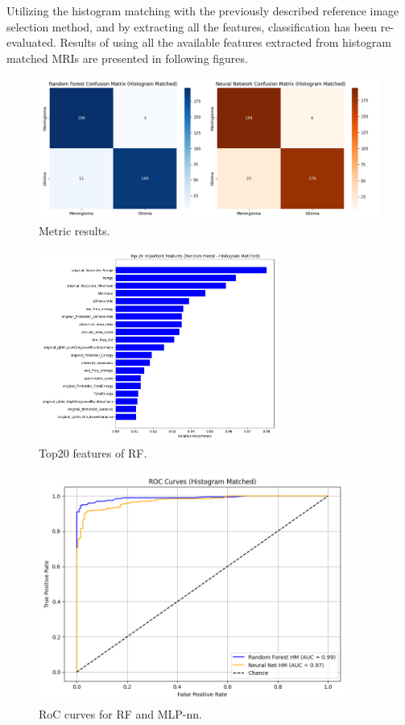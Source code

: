 \documentclass[11pt,a4paper]{article}
\begin{document}
		Utilizing the histogram matching with the previously described reference image selection method,
		and by extracting all the features, classification has been re-evaluated.
		Results of using all the available features extracted from histogram matched MRIs 
		are presented in following figures.
		\begin{figure}[H]
			\centering
			\includegraphics[width=1.1\textwidth]{images/metrics_hm.png}
			\caption{Metric results.}
			\label{fig1:}
		\end{figure}		

		\begin{figure}[H]
			\centering
			\includegraphics[width=0.7\textwidth]{images/top20_rf_hm.png}
			\caption{Top20 features of RF.}
			\label{fig1:}
		\end{figure}		

		\begin{figure}[H]
			\centering
			\includegraphics[width=0.9\textwidth]{images/roc_hm.png}
			\caption{RoC curves for RF and MLP-nn.}
			\label{fig1:}
		\end{figure}		
\end{document}
